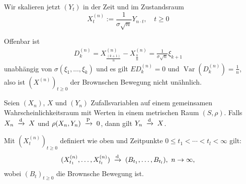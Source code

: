 \documentclass[a4paper,twoside,DIV15,BCOR12mm]{scrbook}
\begin{document}
Wir skalieren jetzt $(Y_t)$ in der Zeit und im Zustandsraum
\[
X_t^{(n)}:=\frac{1}{\sigma\sqrt{n}}Y_{n\cdot t},\quad t\geq0
\]

\begin{bemerkung}
Offenbar ist
\begin{align*}
D_k^{(n)} = X_{\frac{(k+1)}n}^{(n)} - X_{\frac kn}^{(n)}
= \frac 1 {\sigma\sqrt n} \xi_{k+1}
\end{align*}
unabhängig von $\sigma(\xi_1,\ldots,\xi_k)$ und es gilt $ED_k^{(n)} = 0$ und $\operatorname{Var}(D_k^{(n)}) = \frac 1n$, also ist $(X^{(n)})_{t\ge 0}$ der Brownschen Bewegung nicht unähnlich.
\end{bemerkung}

\begin{lemma}
Seien $(X_n)$, $X$ und $(Y_n)$ Zufallsvariablen auf einem gemeinsamen Wahrscheinlichkeitsraum mit Werten in einem metrischen Raum $(S,\rho)$. Falls $X_n \tonach{d} X$ und $\rho(X_n,Y_n)\tonach{P} 0$, dann gilt $Y_n \tonach{d} X$.
\label{lemma:14.1}
\end{lemma}

\begin{satz}
\label{satz:14.2}Mit $(X^{(n)}_t)_{t\ge0}$ definiert wie oben und Zeitpunkte $0\le t_1<\cdots<t_l<\infty$ gilt:
\begin{align*}
(X_{t_1}^{(n)},\ldots,X_{t_l}^{(n)}) \tonach{d} (B_{t_1},\ldots,B_{t_l}),\ n\to \infty,
\end{align*}
wobei $(B_t)_{t\ge 0}$ die Brownsche Bewegung ist.
\end{satz}
\end{document}
